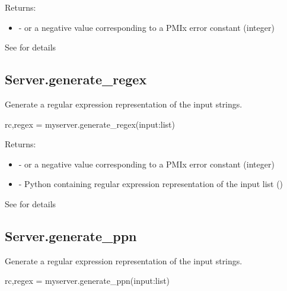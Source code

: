 Returns:

\begin{itemize}
    \item {} -  or a negative value corresponding to a PMIx error constant (integer)
\end{itemize}


See  for details


\subsection{Server.generate_regex}

\summary
Generate a regular expression representation of the input strings.

\format

\pyspecificstart
\begin{codepar}
rc,regex = myserver.generate_regex(input:list)
\end{codepar}
\pyspecificend


\begin{arglist}
\end{arglist}

Returns:

\begin{itemize}
    \item {} -  or a negative value corresponding to a PMIx error constant (integer)
    \item {} - Python  containing regular expression representation of the input list ()
\end{itemize}


See  for details


\subsection{Server.generate_ppn}

\summary
Generate a regular expression representation of the input strings.

\format

\pyspecificstart
\begin{codepar}
rc,regex = myserver.generate_ppn(input:list)
\end{codepar}
\pyspecificend



